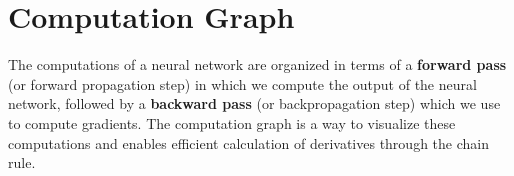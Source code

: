 \documentclass[11pt,a4paper]{article}
\theoremstyle{definition}
\theoremstyle{remark}
\begin{document}
\clearpage

\section{Computation Graph}

\begin{keyconcept}
The computations of a neural network are organized in terms of a \textbf{forward pass} (or forward propagation step) in which we compute the output of the neural network, followed by a \textbf{backward pass} (or backpropagation step) which we use to compute gradients. The computation graph is a way to visualize these computations and enables efficient calculation of derivatives through the chain rule.
\end{keyconcept}

\vspace{0.4cm}
\end{document}

